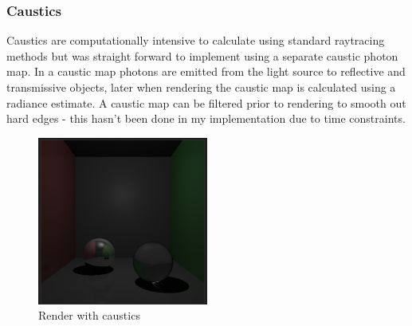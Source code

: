 \documentclass{article}
\begin{document}
\subsubsection{Caustics}
Caustics are computationally intensive to calculate using standard raytracing methods but was straight forward to implement using a separate caustic photon map. In a caustic map photons are emitted from the light source to reflective and transmissive objects, later when rendering the caustic map is calculated using a radiance estimate. A caustic map can be filtered prior to rendering to smooth out hard edges - this hasn't been done in my implementation due to time constraints.
\begin{figure}[h]
\centering
\includegraphics[width=0.5\textwidth]{caustics}
\captionsetup{justification=centering,margin=0.5cm}
\caption{Render with caustics}
\label{fig:caustics}
\end{figure}

\newpage
\begin{appendix}
\listoffigures
\end{appendix}



\end{document}
